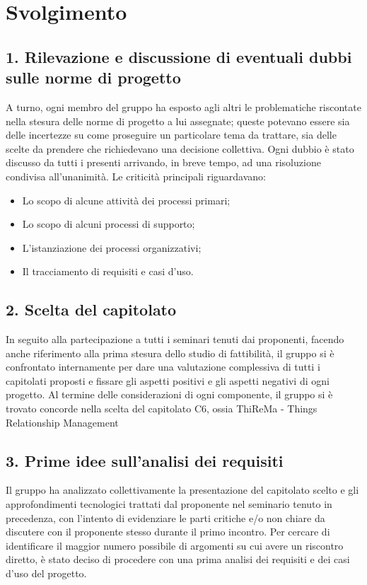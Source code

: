 \newpage
\section*{Svolgimento}

\subsection*{1. Rilevazione e discussione di eventuali dubbi sulle norme di progetto}

A turno, ogni membro del gruppo ha esposto agli altri le problematiche riscontate nella stesura delle norme di progetto a lui assegnate; queste potevano essere sia delle incertezze su come proseguire un particolare tema da trattare, sia delle scelte da prendere che richiedevano una decisione collettiva.
Ogni dubbio è stato discusso da tutti i presenti arrivando, in breve tempo, ad una risoluzione condivisa all'unanimità.
Le criticità principali riguardavano:
\begin{itemize}
	\item Lo scopo di alcune attività dei processi primari;
	\item Lo scopo di alcuni processi di supporto;
	\item L'istanziazione dei processi organizzativi;
	\item Il tracciamento di requisiti e casi d'uso.
\end{itemize}

\subsection*{2. Scelta del capitolato}

In seguito alla partecipazione a tutti i seminari tenuti dai proponenti, facendo anche riferimento alla prima stesura dello studio di fattibilità, il gruppo si è confrontato internamente per dare una valutazione complessiva di tutti i capitolati proposti e fissare gli aspetti positivi e gli aspetti negativi di ogni progetto.
Al termine delle considerazioni di ogni componente, il gruppo si è trovato concorde nella scelta del capitolato C6, ossia ThiReMa - Things Relationship Management

\subsection*{3. Prime idee sull'analisi dei requisiti}

Il gruppo ha analizzato collettivamente la presentazione del capitolato scelto e gli approfondimenti tecnologici trattati dal proponente nel seminario tenuto in precedenza, con l'intento di evidenziare le parti critiche e/o non chiare da discutere con il proponente stesso durante il primo incontro.
Per cercare di identificare il maggior numero possibile di argomenti su cui avere un riscontro diretto, è stato deciso di procedere con una prima analisi dei requisiti e dei casi d'uso del progetto.

